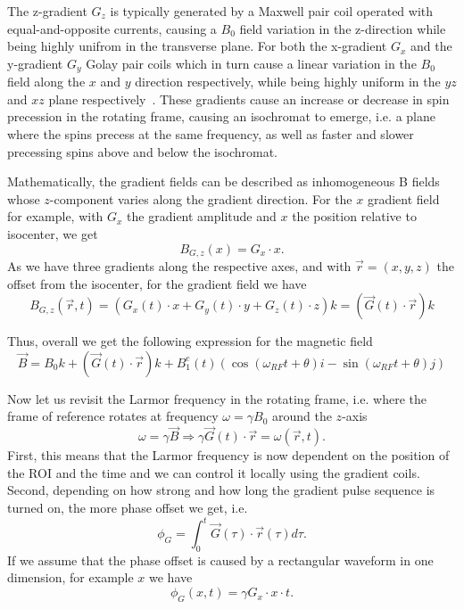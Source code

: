 The z-gradient $G_z$ is typically generated by a Maxwell pair coil operated with equal-and-opposite currents, causing a $B_0$ field variation in the z-direction while being highly unifrom in the transverse plane.
For both the x-gradient $G_x$ and the y-gradient $G_y$ Golay pair coils which in turn cause a linear variation in the $B_0$ field along the $x$ and $y$ direction respectively, while being highly uniform in the $yz$ and $xz$ plane respectively~\autocite{brown_introduction_2014}.
These gradients cause an increase or decrease in spin precession in the rotating frame, causing an isochromat to emerge, i.e. a plane where the spins precess at the same frequency, as well as faster and slower precessing spins above and below the isochromat.

Mathematically, the gradient fields can be described as inhomogeneous B fields whose $z$-component varies along the gradient direction.
For the $x$ gradient field for example, with $G_x$ the gradient amplitude and $x$ the position relative to isocenter, we get
\[ B_{G, z} (x) = G_x \cdot x. \]
As we have three gradients along the respective axes, and with $\overrightarrow{r} = (x, y, z)$ the offset from the isocenter, for the gradient field we have
\[ B_{G, z} (\overrightarrow{r}, t) = (G_x(t) \cdot x + G_y(t) \cdot y + G_z(t) \cdot z) k = ( \overrightarrow{G}(t) \cdot \overrightarrow{r}) k \]

Thus, overall we get the following expression for the magnetic field
\[ \overrightarrow{B} = B_0 k + (\overrightarrow{G}(t) \cdot \overrightarrow{r}) k + B_1^e (t) \left(\cos\left(\omega_{RF} t + \theta \right) i - \sin\left(\omega_{RF} t + \theta \right) j \right) \]

Now let us revisit the Larmor frequency in the rotating frame, i.e. where the frame of reference rotates at frequency $\omega = \gamma B_0$ around the $z$-axis
\[ \omega = \gamma \overrightarrow{B} \Rightarrow \gamma \overrightarrow{G}(t) \cdot \overrightarrow{r} = \omega(\overrightarrow{r}, t). \]
First, this means that the Larmor frequency is now dependent on the position of the ROI and the time and we can control it locally using the gradient coils.
Second, depending on how strong and how long the gradient pulse sequence is turned on, the more phase offset we get, i.e.
\[ \phi_G = \int_0^t \overrightarrow{G}(\tau) \cdot \overrightarrow{r}(\tau) d \tau. \]
If we assume that the phase offset is caused by a rectangular waveform in one dimension, for example $x$ we have
\[ \phi_G (x, t) = \gamma G_x \cdot x \cdot t. \]

